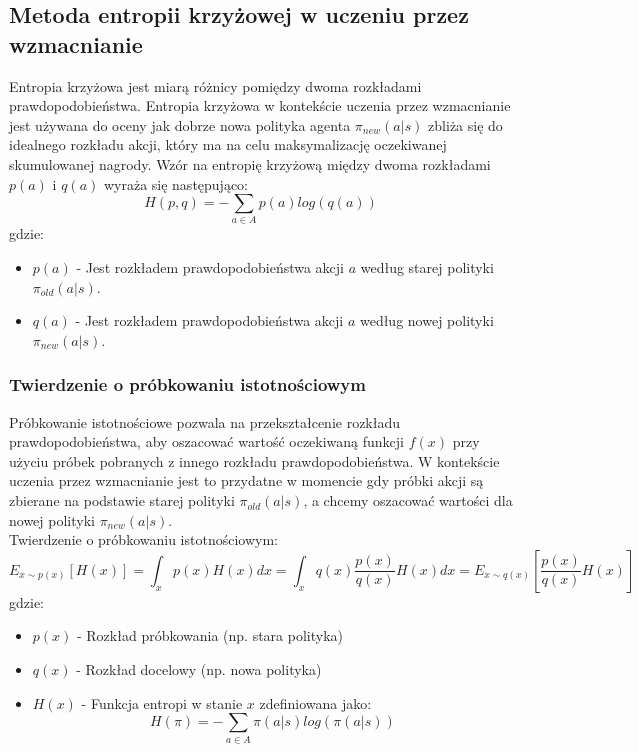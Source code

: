 \documentclass[a4paper, 10pt]{article}
\begin{document}
    \subsection{Metoda entropii krzyżowej w uczeniu przez wzmacnianie}
    Entropia krzyżowa jest miarą różnicy pomiędzy dwoma rozkładami prawdopodobieństwa. Entropia krzyżowa w kontekście uczenia przez wzmacnianie
    jest używana do oceny jak dobrze nowa polityka agenta \( \pi_{new}(a|s) \) zbliża się do idealnego rozkładu akcji, który ma na celu maksymalizację oczekiwanej skumulowanej nagrody.
    Wzór na entropię krzyżową między dwoma rozkładami \( p(a) \) i \( q(a) \) wyraża się następująco:
    \[ H(p,q) = - \sum_{a \in A} p(a) log(q(a)) \]
    gdzie:
    \begin{itemize}
        \item \( p(a) \) - Jest rozkładem prawdopodobieństwa akcji \( a \) według starej polityki \( \pi_{old}(a|s) \).
        \item \( q(a) \) - Jest rozkładem prawdopodobieństwa akcji \( a \) według nowej polityki \( \pi_{new} (a|s) \).
    \end{itemize} 
    \subsubsection{Twierdzenie o próbkowaniu istotnościowym}
    Próbkowanie istotnościowe pozwala na przekształcenie rozkładu prawdopodobieństwa, aby oszacować wartość oczekiwaną funkcji \( f(x) \) przy
    użyciu próbek pobranych z innego rozkładu prawdopodobieństwa. W kontekście uczenia przez wzmacnianie jest to przydatne w momencie gdy
    próbki akcji są zbierane na podstawie starej polityki \( \pi_{old}(a|s) \), a chcemy oszacować wartości dla nowej polityki \( \pi_{new} (a|s) \).
    \\ Twierdzenie o próbkowaniu istotnościowym:
    \[ E_{x \sim p(x)} [H(x)] = \int_{x} p(x)H(x) dx = \int_{x} q(x) \frac{p(x)}{q(x)} H(x) dx = E_{x \sim q(x)} [\frac{p(x)}{q(x)}H(x)]\] 
    gdzie:
    \begin{itemize}
        \item \( p(x) \) - Rozkład próbkowania (np. stara polityka)
        \item \( q(x) \) - Rozkład docelowy (np. nowa polityka)
        \item \( H(x) \) - Funkcja entropi w stanie \( x \) zdefiniowana jako:
        \[ H(\pi) = - \sum_{a \in A} \pi(a|s)log(\pi(a|s)) \]
    \end{itemize}
\end{document}
